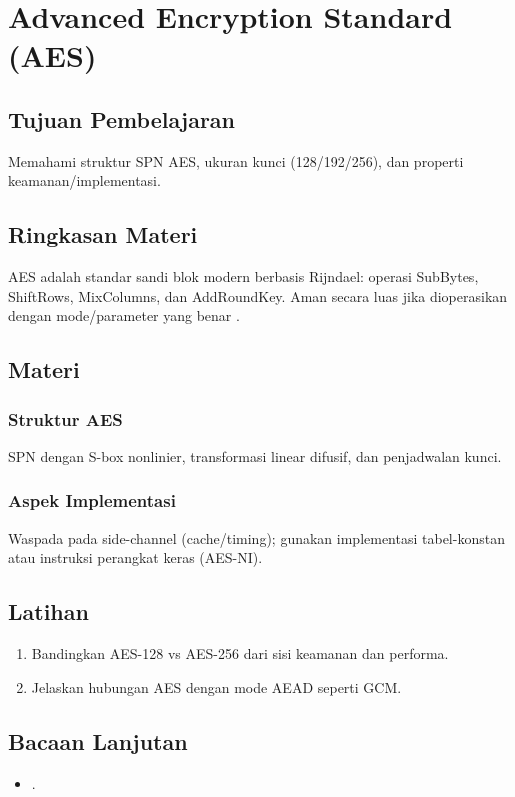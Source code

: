 \documentclass[../main.tex]{subfiles}
\begin{document}
\chapter{Advanced Encryption Standard (AES)}
\section{Tujuan Pembelajaran}
Memahami struktur SPN AES, ukuran kunci (128/192/256), dan properti keamanan/implementasi.

\section{Ringkasan Materi}
AES adalah standar sandi blok modern berbasis Rijndael: operasi SubBytes, ShiftRows, MixColumns, dan AddRoundKey. Aman secara luas jika dioperasikan dengan mode/parameter yang benar \citep{fips197}.

\section{Materi}
\subsection{Struktur AES}
SPN dengan S-box nonlinier, transformasi linear difusif, dan penjadwalan kunci.

\subsection{Aspek Implementasi}
Waspada pada side-channel (cache/timing); gunakan implementasi tabel-konstan atau instruksi perangkat keras (AES-NI).

\section{Latihan}
\begin{enumerate}
  \item Bandingkan AES-128 vs AES-256 dari sisi keamanan dan performa.
  \item Jelaskan hubungan AES dengan mode AEAD seperti GCM.
\end{enumerate}

\section{Bacaan Lanjutan}
\begin{itemize}
  \item \citep{fips197}.
\end{itemize}
\end{document}
